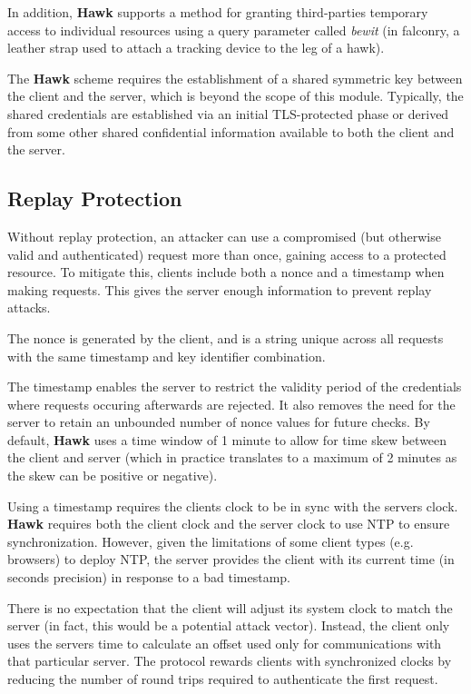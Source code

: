 In addition, {\bfseries Hawk} supports a method for granting third-\/parties temporary access to individual resources using a query parameter called {\itshape bewit} (in falconry, a leather strap used to attach a tracking device to the leg of a hawk).

The {\bfseries Hawk} scheme requires the establishment of a shared symmetric key between the client and the server, which is beyond the scope of this module. Typically, the shared credentials are established via an initial T\+L\+S-\/protected phase or derived from some other shared confidential information available to both the client and the server.

\subsection*{Replay Protection}

Without replay protection, an attacker can use a compromised (but otherwise valid and authenticated) request more than once, gaining access to a protected resource. To mitigate this, clients include both a nonce and a timestamp when making requests. This gives the server enough information to prevent replay attacks.

The nonce is generated by the client, and is a string unique across all requests with the same timestamp and key identifier combination.

The timestamp enables the server to restrict the validity period of the credentials where requests occuring afterwards are rejected. It also removes the need for the server to retain an unbounded number of nonce values for future checks. By default, {\bfseries Hawk} uses a time window of 1 minute to allow for time skew between the client and server (which in practice translates to a maximum of 2 minutes as the skew can be positive or negative).

Using a timestamp requires the client\textquotesingle{}s clock to be in sync with the server\textquotesingle{}s clock. {\bfseries Hawk} requires both the client clock and the server clock to use N\+TP to ensure synchronization. However, given the limitations of some client types (e.\+g. browsers) to deploy N\+TP, the server provides the client with its current time (in seconds precision) in response to a bad timestamp.

There is no expectation that the client will adjust its system clock to match the server (in fact, this would be a potential attack vector). Instead, the client only uses the server\textquotesingle{}s time to calculate an offset used only for communications with that particular server. The protocol rewards clients with synchronized clocks by reducing the number of round trips required to authenticate the first request.

